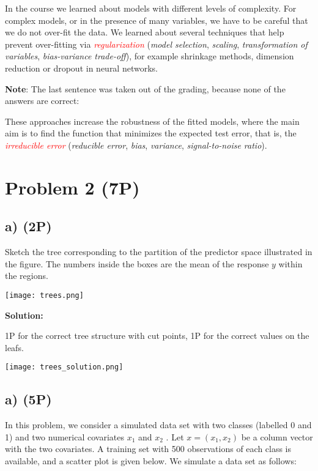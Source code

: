 \documentclass[
]{article}
\begin{document}
In the course we learned about models with different levels of
complexity. For complex models, or in the presence of many variables, we
have to be careful that we do not over-fit the data. We learned about
several techniques that help prevent over-fitting via
\emph{\textcolor{red}{regularization}} (\emph{model selection},
\emph{scaling}, \emph{transformation of variables}, \emph{bias-variance
trade-off}), for example shrinkage methods, dimension reduction or
dropout in neural networks.

\textbf{Note}: The last sentence was taken out of the grading, because
none of the answers are correct:

These approaches increase the robustness of the fitted models, where the
main aim is to find the function that minimizes the expected test error,
that is, the \emph{\textcolor{red}{irreducible error}} (\emph{reducible
error}, \emph{bias}, \emph{variance}, \emph{signal-to-noise ratio}).

\hypertarget{problem-2-7p}{%
\section{Problem 2 (7P)}\label{problem-2-7p}}

\hypertarget{a-2p}{%
\subsection{a) (2P)}\label{a-2p}}

Sketch the tree corresponding to the partition of the predictor space
illustrated in the figure. The numbers inside the boxes are the mean of
the response \(y\) within the regions.

\texttt{[image: trees.png]}

\textbf{Solution:}

1P for the correct tree structure with cut points, 1P for the correct
values on the leafs.

\texttt{[image: trees\_solution.png]}

\hypertarget{a-5p}{%
\subsection{a) (5P)}\label{a-5p}}

In this problem, we consider a simulated data set with two classes
(labelled 0 and 1) and two numerical covariates \(x_1\) and \(x_2\) .
Let \(x = (x_1 , x_2)\) be a column vector with the two covariates. A
training set with 500 observations of each class is available, and a
scatter plot is given below. We simulate a data set as follows:
\end{document}
